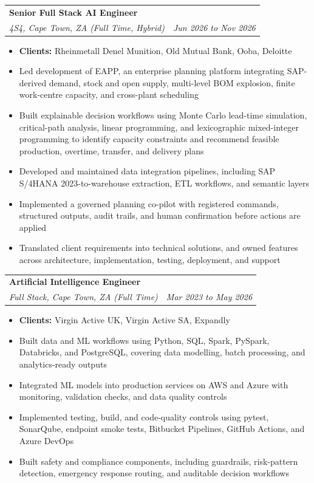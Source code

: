\documentclass[letterpaper,11pt]{article}
\makeatletter
\newcommand{\resumeItem}[1]{
  \item\small{
    {#1 \vspace{-1pt}}
  }
}
\newcommand{\resumeSubheading}[4]{
  \vspace{-2pt}\item
    \begin{tabular*}{1.0\textwidth}[t]{l@{\extracolsep{\fill}}r}
      \textbf{\large#1} & \textbf{\small #2} \\
      \textit{\large#3} & \textit{\small #4} \\

    \end{tabular*}\vspace{-7pt}
}
\newcommand{\resumeItemListStart}{\begin{itemize}[leftmargin=0.1in]}
\newcommand{\resumeItemListEnd}{\end{itemize}\vspace{-5pt}}
\makeatother
\begin{document}
    \resumeSubheading
      {Senior Full Stack AI Engineer}{}
      {4S4, Cape Town, ZA (Full Time, Hybrid)}{Jun 2026 to Nov 2026}
      \resumeItemListStart
            \resumeItem{\small{\textbf{Clients:} Rheinmetall Denel Munition, Old Mutual Bank, Ooba, Deloitte}}
            \resumeItem{\small{Led development of EAPP, an enterprise planning platform integrating SAP-derived demand, stock and open supply, multi-level BOM explosion, finite work-centre capacity, and cross-plant scheduling}}
            \resumeItem{\small{Built explainable decision workflows using Monte Carlo lead-time simulation, critical-path analysis, linear programming, and lexicographic mixed-integer programming to identify capacity constraints and recommend feasible production, overtime, transfer, and delivery plans}}
            \resumeItem{\small{Developed and maintained data integration pipelines, including SAP S/4HANA 2023-to-warehouse extraction, ETL workflows, and semantic layers}}
            \resumeItem{\small{Implemented a governed planning co-pilot with registered commands, structured outputs, audit trails, and human confirmation before actions are applied}}
            \resumeItem{\small{Translated client requirements into technical solutions, and owned features across architecture, implementation, testing, deployment, and support}}
      \resumeItemListEnd
      \vspace{4pt}

    \resumeSubheading
      {Artificial Intelligence Engineer}{}
      {Full Stack, Cape Town, ZA (Full Time)}{Mar 2023 to May 2026}
      \resumeItemListStart
            \resumeItem{\small{\textbf{Clients:} Virgin Active UK, Virgin Active SA, Expandly}}
            \resumeItem{\small{Built data and ML workflows using Python, SQL, Spark, PySpark, Databricks, and PostgreSQL, covering data modelling, batch processing, and analytics-ready outputs}}
            \resumeItem{\small{Integrated ML models into production services on AWS and Azure with monitoring, validation checks, and data quality controls}}
            \resumeItem{\small{Implemented testing, build, and code-quality controls using pytest, SonarQube, endpoint smoke tests, Bitbucket Pipelines, GitHub Actions, and Azure DevOps}}
            \resumeItem{\small{Built safety and compliance components, including guardrails, risk-pattern detection, emergency response routing, and auditable decision workflows}}
      \resumeItemListEnd
      \vspace{4pt}
\end{document}
